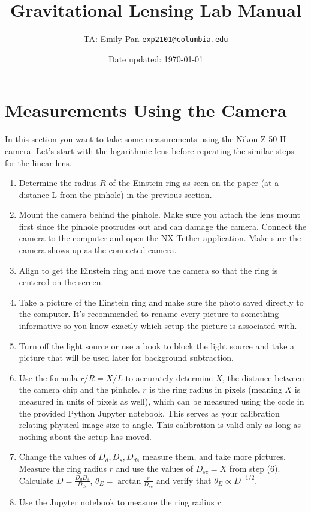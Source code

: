 \documentclass{article}
\title{\vspace{-1cm}\textbf{Gravitational Lensing Lab Manual}}
\author{TA: Emily Pan \href{mailto:exp2101@columbia.edu}{\texttt{exp2101@columbia.edu}}}
\date{Date updated: \today}
\begin{document}
\maketitle
\thispagestyle{fancy}

\section*{Measurements Using the Camera}
In this section you want to take some measurements using the Nikon Z 50 II camera. Let's start with the logarithmic lens before repeating the similar steps for the linear lens.
\begin{enumerate}
    \item Determine the radius $R$ of the Einstein ring as seen on the paper (at a distance L from the pinhole) in the previous section.
    \item Mount the camera behind the pinhole. Make sure you attach the lens mount first since the pinhole protrudes out and can damage the camera. Connect the camera to the computer and open the NX Tether application. Make sure the camera shows up as the connected camera. 
    \item Align to get the Einstein ring and move the camera so that the ring is centered on the screen.
    \item Take a picture of the Einstein ring and make sure the photo saved directly to the computer. It's recommended to rename every picture to something informative so you know exactly which setup the picture is associated with.
    \item Turn off the light source or use a book to block the light source and take a picture that will be used later for background subtraction.
    \item Use the formula $r/R=X/L$ to accurately determine $X$, the distance between the camera chip and the pinhole. $r$ is the ring radius in pixels (meaning $X$ is measured in units of pixels as well), which can be measured using the code in the provided Python Jupyter notebook. This serves as your calibration relating physical image size to angle. This calibration is valid only as long as nothing about the setup has moved.
    \item Change the values of $D_d, D_s, D_{ds}$ measure them, and take more pictures. Measure the ring radius $r$ and use the values of $D_{sc}=X$ from step (6). Calculate $D=\frac{D_d D_s}{D_{ds}}$, $\theta_E=\arctan\frac{r}{D_{sc}}$ and verify that $\theta_E \propto D^{-1/2}$.
    \item Use the Jupyter notebook to measure the ring radius $r$.

\end{enumerate}
\end{document}
